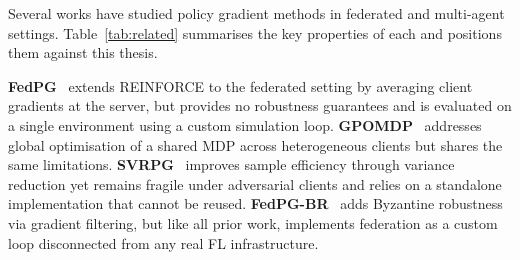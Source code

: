 \documentclass[a4paper, oneside]{discothesis}
\begin{document}
Several works have studied policy gradient methods in federated and multi-agent settings. Table~\ref{tab:related} summarises the key properties of each and positions them against this thesis.

\begin{table}[h]
\centering
\caption{Comparison of related FedRL works. \textbf{Byz.\ robust}: tolerates Byzantine clients. \textbf{Variance red.}: uses variance reduction in gradient estimation. \textbf{Multi-env}: evaluated on more than one environment. \textbf{Real FL stack}: built on a production federated learning framework (not a custom simulation loop). \textbf{Shared codebase}: implementation is public and reusable. \textbf{Defines eval.\ problem}: provides a formal definition of the evaluation setup.}
\label{tab:related}
\end{table}

\textbf{FedPG}~\cite{FedPGBR} extends REINFORCE to the federated setting by averaging client gradients at the server, but provides no robustness guarantees and is evaluated on a single environment using a custom simulation loop. \textbf{GPOMDP}~\cite{GPOMDP} addresses global optimisation of a shared MDP across heterogeneous clients but shares the same limitations. \textbf{SVRPG}~\cite{SVRPG} improves sample efficiency through variance reduction yet remains fragile under adversarial clients and relies on a standalone implementation that cannot be reused. \textbf{FedPG-BR}~\cite{FedPGBR} adds Byzantine robustness via gradient filtering, but like all prior work, implements federation as a custom loop disconnected from any real FL infrastructure.
\end{document}
